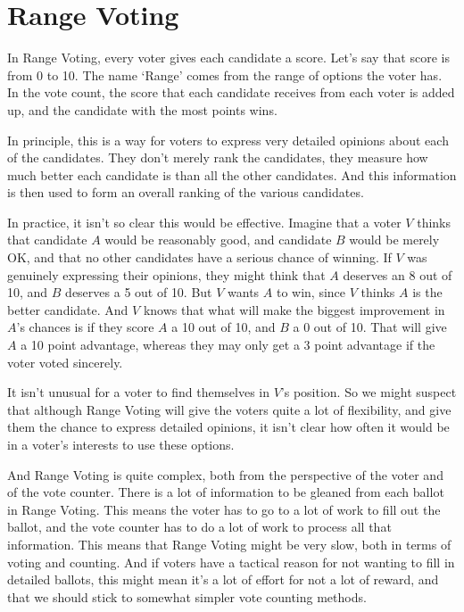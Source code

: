 \section{Range Voting}
In Range Voting, every voter gives each candidate a score. Let's say that score is from 0 to 10. The name `Range' comes from the range of options the voter has. In the vote count, the score that each candidate receives from each voter is added up, and the candidate with the most points wins.

In principle, this is a way for voters to express very detailed opinions about each of the candidates. They don't merely rank the candidates, they measure how much better each candidate is than all the other candidates. And this information is then used to form an overall ranking of the various candidates.

In practice, it isn't so clear this would be effective. Imagine that a voter $V$ thinks that candidate $A$ would be reasonably good, and candidate $B$ would be merely OK, and that no other candidates have a serious chance of winning. If $V$ was genuinely expressing their opinions, they might think that $A$ deserves an 8 out of 10, and $B$ deserves a 5 out of 10. But $V$ wants $A$ to win, since $V$ thinks $A$ is the better candidate. And $V$ knows that what will make the biggest improvement in $A$'s chances is if they score $A$ a 10 out of 10, and $B$ a 0 out of 10. That will give $A$ a 10 point advantage, whereas they may only get a 3 point advantage if the voter voted sincerely.

It isn't unusual for a voter to find themselves in $V$'s position. So we might suspect that although Range Voting will give the voters quite a lot of flexibility, and give them the chance to express detailed opinions, it isn't clear how often it would be in a voter's interests to use these options.

And Range Voting is quite complex, both from the perspective of the voter and of the vote counter. There is a lot of information to be gleaned from each ballot in Range Voting. This means the voter has to go to a lot of work to fill out the ballot, and the vote counter has to do a lot of work to process all that information. This means that Range Voting might be very slow, both in terms of voting and counting. And if voters have a tactical reason for not wanting to fill in detailed ballots, this might mean it's a lot of effort for not a lot of reward, and that we should stick to somewhat simpler vote counting methods.
